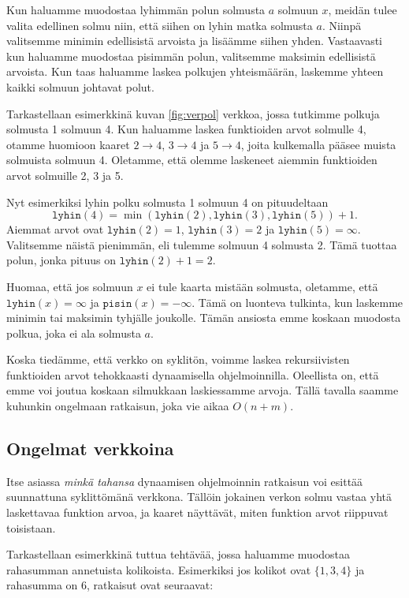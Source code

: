 Kun haluamme muodostaa lyhimmän polun solmusta $a$ solmuun $x$,
meidän tulee valita edellinen solmu niin,
että siihen on lyhin matka solmusta $a$.
Niinpä valitsemme minimin edellisistä arvoista
ja lisäämme siihen yhden.
Vastaavasti kun haluamme muodostaa pisimmän polun,
valitsemme maksimin edellisistä arvoista.
Kun taas haluamme laskea polkujen yhteismäärän,
laskemme yhteen kaikki solmuun johtavat polut.

Tarkastellaan esimerkkinä kuvan \ref{fig:verpol} verkkoa,
jossa tutkimme polkuja solmusta 1 solmuun 4.
Kun haluamme laskea funktioiden arvot solmulle 4,
otamme huomioon kaaret
$2 \rightarrow 4$, $3 \rightarrow 4$ ja $5 \rightarrow 4$,
joita kulkemalla pääsee muista solmuista solmuun 4.
Oletamme, että olemme laskeneet aiemmin funktioiden
arvot solmuille 2, 3 ja 5.

Nyt esimerkiksi lyhin polku solmusta 1 solmuun 4 on pituudeltaan
\[ \texttt{lyhin}(4)=\min(\texttt{lyhin}(2),\texttt{lyhin}(3),\texttt{lyhin}(5))+1.\]
Aiemmat arvot ovat $\texttt{lyhin}(2)=1$, $\texttt{lyhin}(3)=2$ ja $\texttt{lyhin}(5)=\infty$.
Valitsemme näistä pienimmän, eli tulemme solmuun 4 solmusta 2.
Tämä tuottaa polun, jonka pituus on $\texttt{lyhin}(2)+1=2$.

Huomaa, että jos solmuun $x$ ei tule kaarta mistään solmusta,
oletamme, että $\texttt{lyhin}(x)=\infty$ ja $\texttt{pisin}(x)=-\infty$.
Tämä on luonteva tulkinta, kun laskemme minimin tai maksimin
tyhjälle joukolle.
Tämän ansiosta emme koskaan muodosta polkua,
joka ei ala solmusta $a$.

Koska tiedämme, että verkko on syklitön,
voimme laskea rekursiivisten funktioiden arvot
tehokkaasti dynaamisella ohjelmoinnilla.
Oleellista on, että emme voi joutua koskaan silmukkaan
laskiessamme arvoja.
Tällä tavalla saamme kuhunkin ongelmaan ratkaisun, joka
vie aikaa $O(n+m)$.

\subsection{Ongelmat verkkoina}

Itse asiassa \emph{minkä tahansa} dynaamisen ohjelmoinnin ratkaisun voi
esittää suunnattuna syklittömänä verkkona.
Tällöin jokainen verkon solmu vastaa yhtä laskettavaa funktion arvoa,
ja kaaret näyttävät, miten funktion arvot riippuvat toisistaan.

Tarkastellaan esimerkkinä tuttua tehtävää,
jossa haluamme muodostaa rahasumman annetuista kolikoista.
Esimerkiksi jos kolikot ovat $\{1,3,4\}$ ja rahasumma on 6,
ratkaisut ovat seuraavat:

